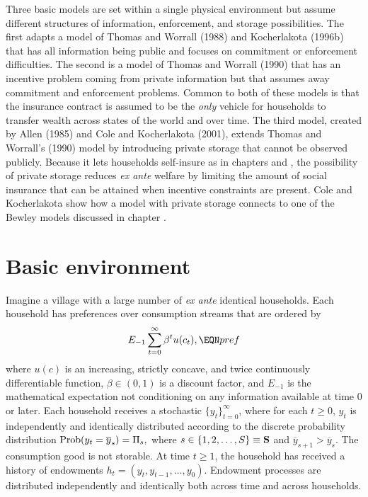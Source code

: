  
   Three basic models  are set within a single physical
environment but  assume different structures of information,
enforcement, and storage possibilities.  The first adapts a model of
Thomas and Worrall (1988) and Kocherlakota (1996b) that  has all
information being public and focuses
 on commitment or enforcement difficulties.  The second is a model of Thomas and
Worrall (1990) that has an incentive problem coming from private
information but that assumes away commitment and enforcement
problems. Common to both of these models is that the insurance
contract is assumed to be the {\it only\/} vehicle  for households
to transfer wealth across states of the world and over time. The
third model, created by Allen (1985) and Cole and Kocherlakota (2001), extends Thomas and
Worrall's (1990) model by introducing private storage that cannot
be observed publicly.  Because it lets households
self-insure as in chapters  and , the possibility of
private storage reduces {\it ex ante\/} welfare by limiting the
amount of social insurance that can be attained when incentive
constraints are present. Cole and Kocherlakota show how  a model with private storage  connects
to one of the Bewley models discussed in chapter .   




\section{Basic environment}

Imagine a  village with a large number of {\it ex ante\/}
identical households. Each household has preferences over
consumption streams that are ordered by
$$ E_{-1}\sum_{t=0}^\infty \beta^t u(c_t), \EQN pref $$
where $u(c)$ is an increasing, strictly concave, and twice
continuously differentiable  function,
 $\beta \in (0,1)$ is a discount factor, and $E_{-1}$ is the mathematical expectation
 not conditioning on any information available at time $0$ or later.   Each household
receives a stochastic  $\{y_t\}_{t=0}^\infty$,
where for each $t \geq 0$, $y_t$ is independently and
identically distributed according to the discrete
probability distribution ${\rm Prob} (y_t = \overline y_s) = \Pi_s,$
where $s \in \{1, 2, \ldots ,S\}\equiv {\bf S}$ and
$\overline y_{s+1}>\overline y_s$.  The consumption
good is not storable.  At time $t \geq 1$, the
household has received a history of endowments
$h_t = (y_t, y_{t-1}, \ldots, y_0).$
Endowment processes are distributed independently and identically
 both across time and
across households.

